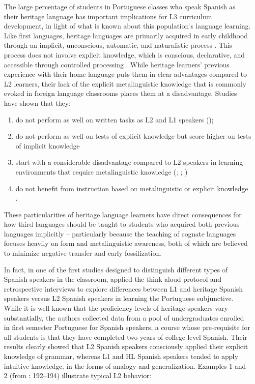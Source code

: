 \documentclass[output=paper]{../langscibook}
\begin{document}
The large percentage of students in Portuguese classes who speak Spanish as their heritage language has important implications for L3 curriculum development, in light of what is known about this population’s language learning. Like first languages, heritage languages are primarily acquired in early childhood through an implicit, unconscious, automatic, and naturalistic process \citep{Zyzik2016}. This process does not involve explicit knowledge, which is conscious, declarative, and accessible through controlled processing \citep{Bowles2011}. While heritage learners’ previous experience with their home language puts them in clear advantages compared to L2 learners, their lack of the explicit metalinguistic knowledge that is commonly evoked in foreign language classrooms places them at a disadvantage. Studies have shown that they:

\begin{enumerate}
\item do not perform as well on written tasks as L2 and L1 speakers (\citealt{MontrulEtAl2008});
\item do not perform as well on tests of explicit knowledge but score higher on tests of implicit knowledge \citep{Bowles2011}
\item
start with a considerable disadvantage compared to L2 speakers in learning environments that require metalinguistic knowledge (\citealt{Correa2014}; \citealt{Carreira2017}; \citealt{PotowskiEtAl2009})
\item
do not benefit from instruction based on metalinguistic or explicit knowledge \citep{Beaudrie2017}.
\end{enumerate}

These particularities of heritage language learners have direct consequences for how third languages should be taught to students who acquired both previous languages implicitly -- particularly because the teaching of cognate languages focuses heavily on form and metalinguistic awareness, both of which are believed to minimize negative transfer and early fossilization. 

In fact, in one of the first studies designed to distinguish different types of Spanish speakers in the classroom, \citet{CarvalhoSilva2006} applied the think aloud protocol and retrospective interviews to explore differences between L1 and heritage Spanish speakers versus L2 Spanish speakers in learning the Portuguese subjunctive. While it is well known that the proficiency levels of heritage speakers vary substantially, the authors collected data from a pool of undergraduates enrolled in first semester Portuguese for Spanish speakers, a course whose pre-requisite for all students is that they have completed two years of college-level Spanish. Their results clearly showed that L2 Spanish speakers consciously applied their explicit knowledge of grammar, whereas L1 and HL Spanish speakers tended to apply intuitive knowledge, in the forms of analogy and generalization. Examples 1 and 2 (from \citealt{CarvalhoSilva2006}: 192–194) illustrate typical L2 behavior:
\end{document}
